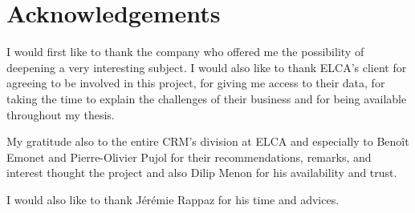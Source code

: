 \chapter*{Acknowledgements}

\vspace{0.5cm}

I would first like to thank the company who offered me the possibility of deepening a very interesting subject. I would also like to thank ELCA's client for agreeing to be involved in this project, for giving me access to their data, for taking the time to explain the challenges of their business and for being available throughout my thesis.

\par

My gratitude also to the entire CRM's division at ELCA and especially to Benoît Emonet and Pierre-Olivier Pujol for their recommendations, remarks, and interest thought the project and also Dilip Menon for his availability and trust.
\par

I would also like to thank Jérémie Rappaz for his time and advices.